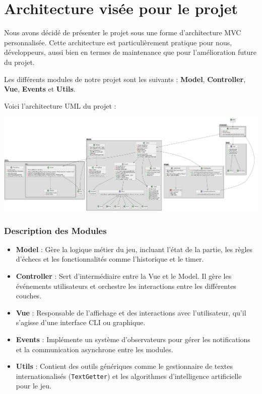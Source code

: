 \documentclass{article}
\begin{document}
\section{Architecture visée pour le projet}
Nous avons décidé de présenter le projet sous une forme d'architecture MVC personnalisée. Cette architecture est particulièrement pratique pour nous, développeurs, aussi bien en termes de maintenance que pour l'amélioration future du projet.

Les différents modules de notre projet sont les suivants : \textbf{Model}, \textbf{Controller}, \textbf{Vue}, \textbf{Events} et \textbf{Utils}. 

Voici l'architecture UML du projet : 

\begin{center}
    \includegraphics[width=\textwidth,height=\textheight,keepaspectratio]{UML}
\end{center}




\subsubsection{Description des Modules}

\begin{itemize}
    \item \textbf{Model} : Gère la logique métier du jeu, incluant l'état de la partie, les règles d'échecs et les fonctionnalités comme l'historique et le timer.
    \item \textbf{Controller} : Sert d'intermédiaire entre la Vue et le Model. Il gère les événements utilisateurs et orchestre les interactions entre les différentes couches.
    \item \textbf{Vue} : Responsable de l'affichage et des interactions avec l'utilisateur, qu'il s'agisse d'une interface CLI ou graphique.
    \item \textbf{Events} : Implémente un système d'observateurs pour gérer les notifications et la communication asynchrone entre les modules.
    \item \textbf{Utils} : Contient des outils génériques comme le gestionnaire de textes internationalisés (\texttt{TextGetter}) et les algorithmes d'intelligence artificielle pour le jeu.
\end{itemize}
\end{document}
